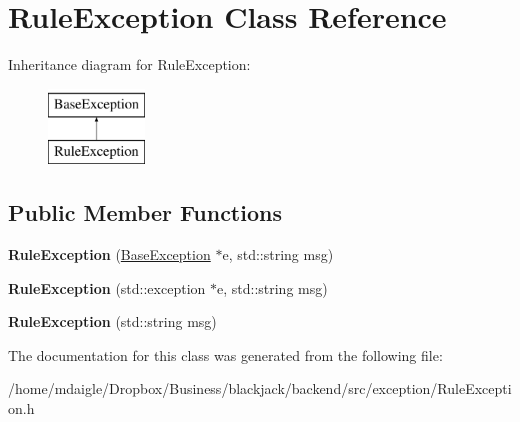 \hypertarget{classRuleException}{
\section{\-Rule\-Exception \-Class \-Reference}
\label{classRuleException}
}
\-Inheritance diagram for \-Rule\-Exception\-:\begin{figure}[H]
\begin{center}
\leavevmode
\includegraphics[height=2.000000cm]{classRuleException}
\end{center}
\end{figure}
\subsection*{\-Public \-Member \-Functions}
\begin{DoxyCompactItemize}
\item 
\hypertarget{classRuleException_aeda01571aa25810ba95330ebdc181fef}{
{\bfseries \-Rule\-Exception} (\hyperlink{classBaseException}{\-Base\-Exception} $\ast$e, std\-::string msg)}
\label{classRuleException_aeda01571aa25810ba95330ebdc181fef}

\item 
\hypertarget{classRuleException_a66291e7d18178478ca94e2a63b43de5a}{
{\bfseries \-Rule\-Exception} (std\-::exception $\ast$e, std\-::string msg)}
\label{classRuleException_a66291e7d18178478ca94e2a63b43de5a}

\item 
\hypertarget{classRuleException_ab61e34f9bccf5acdd7a5c3df7d4c7b3c}{
{\bfseries \-Rule\-Exception} (std\-::string msg)}
\label{classRuleException_ab61e34f9bccf5acdd7a5c3df7d4c7b3c}

\end{DoxyCompactItemize}


\-The documentation for this class was generated from the following file\-:\begin{DoxyCompactItemize}
\item 
/home/mdaigle/\-Dropbox/\-Business/blackjack/backend/src/exception/\-Rule\-Exception.\-h\end{DoxyCompactItemize}
